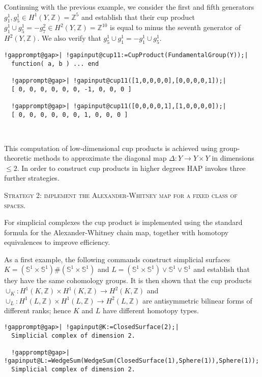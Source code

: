 \documentclass[a4paper,11pt]{report}
\begin{document}
{{Continuing with the previous example, we consider the first and fifth
generators $g_1^1, g_5^1\in H^1(Y,\mathbb Z) =\mathbb Z^5$ and establish that their cup product $ g_1^1 \cup g_5^1 = - g_7^2 \in H^2(Y,\mathbb Z) =\mathbb Z^{10}$ is equal to minus the seventh generator of $H^2(Y,\mathbb Z)$. We also verify that $g_5^1\cup g_1^1 = - g_1^1 \cup g_5^1$. 
\begin{Verbatim}[commandchars=!@|,fontsize=\small,frame=single,label=Example]
  !gapprompt@gap>| !gapinput@cup11:=CupProduct(FundamentalGroup(Y));|
  function( a, b ) ... end
  
  !gapprompt@gap>| !gapinput@cup11([1,0,0,0,0],[0,0,0,0,1]);|
  [ 0, 0, 0, 0, 0, 0, -1, 0, 0, 0 ]
  
  !gapprompt@gap>| !gapinput@cup11([0,0,0,0,1],[1,0,0,0,0]);|
  [ 0, 0, 0, 0, 0, 0, 1, 0, 0, 0 ]
  
  
\end{Verbatim}
 

This computation of low-dimensional cup products is achieved using
group-theoretic methods to approximate the diagonal map $\Delta \colon Y \rightarrow Y\times Y$ in dimensions $\le 2$. In order to construct cup products in higher degrees \textsc{HAP} invokes three further strategies. 

\textsc{Strategy 2: implement the Alexander-Whitney map for a fixed class of spaces.} 

For simplicial complexes the cup product is implemented using the standard
formula for the Alexander-Whitney chain map, together with homotopy
equivalences to improve efficiency. 

As a first example, the following commands construct simplicial surfaces $K=(\mathbb S^1 \times \mathbb S^1) \# (\mathbb S^1 \times \mathbb S^1)$ and $L=(\mathbb S^1 \times \mathbb S^1) \vee \mathbb S^1 \vee \mathbb S^1$ and establish that they have the same cohomology groups. It is then shown that
the cup products $\cup_K\colon H^1(K,\mathbb Z)\times H^1(K,\mathbb Z) \rightarrow H^2(K,\mathbb
Z)$ and $\cup_L\colon H^1(L,\mathbb Z)\times H^1(L,\mathbb Z) \rightarrow H^2(L,\mathbb
Z)$ are antisymmetric bilinear forms of different ranks; hence $K$ and $L$ have different homotopy types. 
\begin{Verbatim}[commandchars=!@|,fontsize=\small,frame=single,label=Example]
  !gapprompt@gap>| !gapinput@K:=ClosedSurface(2);|
  Simplicial complex of dimension 2.
  
  !gapprompt@gap>| !gapinput@L:=WedgeSum(WedgeSum(ClosedSurface(1),Sphere(1)),Sphere(1));|
  Simplicial complex of dimension 2.
  

\end{Verbatim}}}
\end{document}
